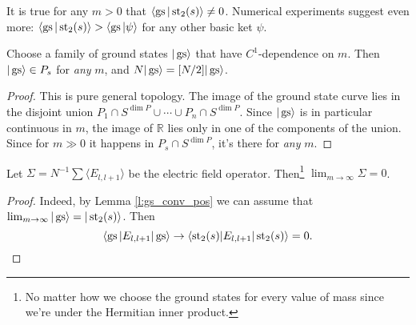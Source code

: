 \begin{conj}
It is true for any $m > 0$ that $\langle \operatorname{gs}|\operatorname{st}_2(s)\rangle \neq 0$. Numerical experiments suggest even more: $\langle \operatorname{gs} | \operatorname{st}_2(s)\rangle > \langle \operatorname{gs} | \psi \rangle$ for any other basic ket $\psi$.
\end{conj}

\begin{proposition}
Choose a family of ground states $|\operatorname{gs}\rangle$ that have $C^1$-dependence on $m$. Then $|\operatorname{gs}\rangle \in P_s$ for \emph{any} $m$, and $N|\operatorname{gs}\rangle = [N/2] |\operatorname{gs}\rangle$.
\end{proposition}
\begin{proof}
This is pure general topology. The image of the ground state curve lies in the disjoint union $P_1 \cap S^{\dim P} \cup \cdots \cup P_n \cap S^{\dim P}$. Since $|\operatorname{gs}\rangle$ is in particular continuous in $m$, the image of $\mathbb R$ lies only in one of the components of the union. Since for $m \gg 0$ it happens in $P_s\cap S^{\dim P}$, it's there for \emph{any} $m$.
\end{proof}

\begin{proposition}
Let $\Sigma = N^{-1}\sum \langle E_{l,l+1} \rangle$ be the electric field operator. Then\footnote{No matter how we choose the ground states for every value of mass since we're under the Hermitian inner product.} $\lim_{m \rightarrow \infty} \Sigma = 0$.
\end{proposition}
\begin{proof}
Indeed, by Lemma \ref{l:gs_conv_pos} we can assume that $\lim_{m \rightarrow \infty} |\operatorname{gs}\rangle = |\operatorname{st}_2(s)\rangle$. Then 
\[
\langle \operatorname{gs} | E_{l,l+1} | \operatorname{gs} \rangle \rightarrow \langle \operatorname{st}_2(s) | E_{l,l+1}|\operatorname{st}_2(s)\rangle = 0.\qedhere
\]
\end{proof}

